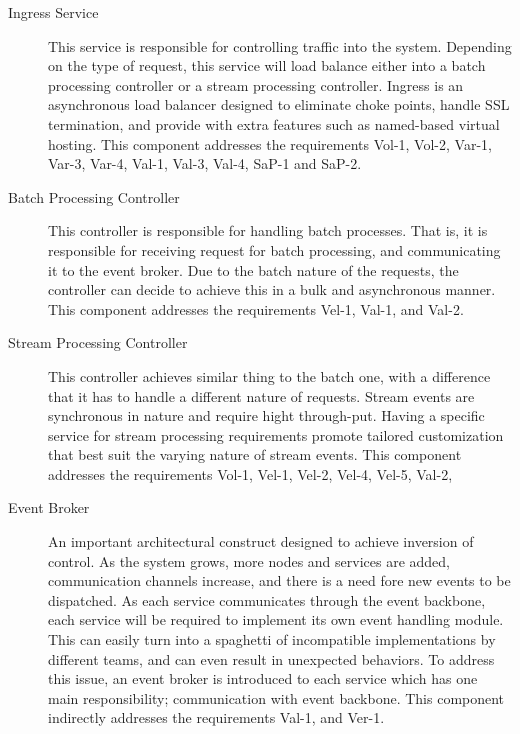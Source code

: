 \documentclass[a4paper,11pt]{article}
\begin{document}
\begin{description}
    \item[Ingress Service] This service is responsible for controlling traffic into the system. Depending on the type of request, this service will load balance either into a batch processing controller or a stream processing controller. Ingress is an asynchronous load balancer designed to eliminate choke points, handle SSL termination, and provide with extra features such as named-based virtual hosting. This component addresses the requirements Vol-1, Vol-2, Var-1, Var-3, Var-4, Val-1, Val-3, Val-4, SaP-1 and SaP-2. 
    
    \item[Batch Processing Controller] This controller is responsible for handling batch processes. That is, it is responsible for receiving request for batch processing, and communicating it to the event broker. Due to the batch nature of the requests, the controller can decide to achieve this in a bulk and asynchronous manner. This component addresses the requirements Vel-1, Val-1, and Val-2. 
    
    \item[Stream Processing Controller] This controller achieves similar thing to the batch one, with a difference that it has to handle a different nature of requests. Stream events are synchronous in nature and require hight through-put. Having a specific service for stream processing requirements promote tailored customization that best suit the varying nature of stream events. This component addresses the requirements Vol-1, Vel-1, Vel-2, Vel-4, Vel-5, Val-2,  
    
    \item[Event Broker] An important architectural construct designed to achieve inversion of control. As the system grows, more nodes and services are added, communication channels increase, and there is a need fore new events to be dispatched. As each service communicates through the event backbone, each service will be required to implement its own event handling module. This can easily turn into a spaghetti of incompatible implementations by different teams, and can even result in unexpected behaviors. To address this issue, an event broker is introduced to each service which has one main responsibility; communication with event backbone. This component indirectly addresses the requirements Val-1, and Ver-1.  
    

\end{description}
\end{document}
